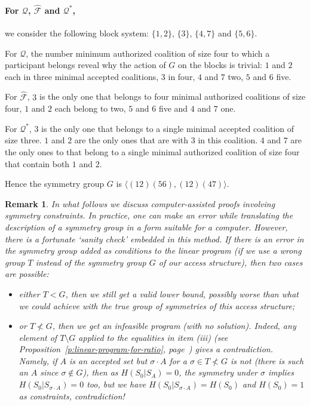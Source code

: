 \documentclass[11pt, a4paper]{kybernetika}
\newtheorem{remark}[theorem]{Remark}
\begin{document}
{		\paragraph{For $\mathcal{Q}$, $\widehat{\mathcal{F}}$ and $\mathcal{Q}^*$,} we consider the following block system: $\{1,2\}$, $\{3\}$, $\{4,7\}$ and $\{5,6\}$.
		
		For $\mathcal{Q}$, the number minimum authorized coalition of size four to which a participant belongs reveal why the action of $G$ on the blocks is trivial: $1$ and $2$ each in three minimal accepted coalitions, $3$ in four, $4$ and $7$ two, $5$ and $6$ five.
		
		For $\widehat{\mathcal{F}}$, $3$ is the only one that belongs to four minimal authorized coalitions of size four, $1$ and $2$ each belong to two, $5$ and $6$ five and $4$ and $7$ one.
		
		For $\mathcal{Q}^*$, $3$ is the only one that belongs to a single minimal accepted coalition of size three. $1$ and $2$ are the only ones that are with $3$ in this coalition. $4$ and $7$ are the only ones to that belong to a single minimal authorized coalition of size four that contain both $1$ and $2$.
		
		Hence the symmetry group $G$ is $\langle(12)(56),(12)(47)\rangle$. 
		
		\begin{remark}
			In what follows we discuss computer-assisted proofs involving symmetry constraints.
			In practice, one can make an error while translating the description of a symmetry group in a form suitable for a computer. However, there is a fortunate `sanity check' embedded in this method.
			If there is an error in the symmetry group added as conditions to the linear program (if we use a wrong group $T$ instead of the symmetry group $G$ of our access structure),
			then two cases are possible:
			
			\begin{itemize}
				\item either $T<G$, then we still get a valid lower bound, possibly worse than what we could achieve with the true group of symmetries of this access structure;
				\item or $T\nless G$, then we get an infeasible program (with no solution). Indeed, any element of $T\setminus G$ applied to the equalities in item (iii) (see Proposition~\ref{p:linear-program-for-ratio}, page~\pageref{p:linear-program-for-ratio}) gives a contradiction. Namely, if $A$ is an accepted set but $\sigma\cdot A$ for a $\sigma\in T\nless G$ is not (there is such an $A$ since $\sigma\notin G$), then as $H(S_0|S_A)=0$, the symmetry under $\sigma$ implies $H(S_0|S_{\sigma\cdot A})=0$ too, but we have $H(S_0|S_{\sigma\cdot A})=H(S_0)$ and $H(S_0)=1$ as constraints, contradiction! 
			\end{itemize}
		\end{remark}
		\normalsize
}
\end{document}
